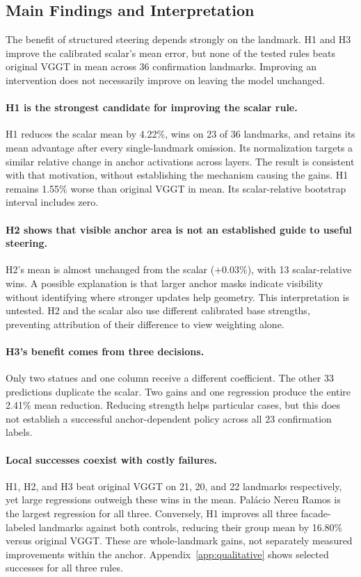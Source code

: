 \subsection{Main Findings and Interpretation}
\label{sec:point3-findings}
The benefit of structured steering depends strongly on the landmark. H1 and H3 improve the calibrated scalar's mean error, but none of the tested rules beats original VGGT in mean across 36 confirmation landmarks. Improving an intervention does not necessarily improve on leaving the model unchanged.

\paragraph{H1 is the strongest candidate for improving the scalar rule.}
H1 reduces the scalar mean by 4.22\%, wins on 23 of 36 landmarks, and retains its mean advantage after every single-landmark omission. Its normalization targets a similar relative change in anchor activations across layers. The result is consistent with that motivation, without establishing the mechanism causing the gains. H1 remains 1.55\% worse than original VGGT in mean. Its scalar-relative bootstrap interval includes zero.

\paragraph{H2 shows that visible anchor area is not an established guide to useful steering.}
H2's mean is almost unchanged from the scalar (+0.03\%), with 13 scalar-relative wins. A possible explanation is that larger anchor masks indicate visibility without identifying where stronger updates help geometry. This interpretation is untested. H2 and the scalar also use different calibrated base strengths, preventing attribution of their difference to view weighting alone.

\paragraph{H3's benefit comes from three decisions.}
Only two statues and one column receive a different coefficient. The other 33 predictions duplicate the scalar. Two gains and one regression produce the entire 2.41\% mean reduction. Reducing strength helps particular cases, but this does not establish a successful anchor-dependent policy across all 23 confirmation labels.

\paragraph{Local successes coexist with costly failures.}
H1, H2, and H3 beat original VGGT on 21, 20, and 22 landmarks respectively, yet large regressions outweigh these wins in the mean. Pal\'acio Nereu Ramos is the largest regression for all three. Conversely, H1 improves all three facade-labeled landmarks against both controls, reducing their group mean by 16.80\% versus original VGGT. These are whole-landmark gains, not separately measured improvements within the anchor. Appendix~\ref{app:qualitative} shows selected successes for all three rules.

